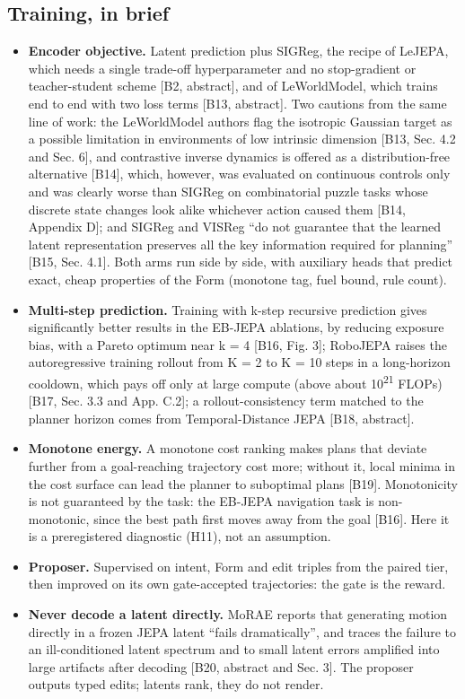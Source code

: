 \documentclass[10pt,letterpaper]{article}
\providecommand{\tightlist}{\setlength{\itemsep}{1pt}\setlength{\parskip}{0pt}}
\begin{document}
\subsection{Training, in brief}\label{training-in-brief}

\begin{itemize}
\tightlist
\item
  \textbf{Encoder objective.} Latent prediction plus SIGReg, the recipe
  of LeJEPA, which needs a single trade-off hyperparameter and no
  stop-gradient or teacher-student scheme {[}B2, abstract{]}, and of
  LeWorldModel, which trains end to end with two loss terms {[}B13,
  abstract{]}. Two cautions from the same line of work: the LeWorldModel
  authors flag the isotropic Gaussian target as a possible limitation in
  environments of low intrinsic dimension {[}B13, Sec. 4.2 and Sec.
  6{]}, and contrastive inverse dynamics is offered as a
  distribution-free alternative {[}B14{]}, which, however, was evaluated
  on continuous controls only and was clearly worse than SIGReg on
  combinatorial puzzle tasks whose discrete state changes look alike
  whichever action caused them {[}B14, Appendix D{]}; and SIGReg and
  VISReg ``do not guarantee that the learned latent representation
  preserves all the key information required for planning'' {[}B15, Sec.
  4.1{]}. Both arms run side by side, with auxiliary heads that predict
  exact, cheap properties of the Form (monotone tag, fuel bound, rule
  count).
\item
  \textbf{Multi-step prediction.} Training with k-step recursive
  prediction gives significantly better results in the EB-JEPA
  ablations, by reducing exposure bias, with a Pareto optimum near k = 4
  {[}B16, Fig. 3{]}; RoboJEPA raises the autoregressive training rollout
  from K = 2 to K = 10 steps in a long-horizon cooldown, which pays off
  only at large compute (above about 10\textsuperscript{21} FLOPs)
  {[}B17, Sec. 3.3 and App. C.2{]}; a rollout-consistency term matched
  to the planner horizon comes from Temporal-Distance JEPA {[}B18,
  abstract{]}.
\item
  \textbf{Monotone energy.} A monotone cost ranking makes plans that
  deviate further from a goal-reaching trajectory cost more; without it,
  local minima in the cost surface can lead the planner to suboptimal
  plans {[}B19{]}. Monotonicity is not guaranteed by the task: the
  EB-JEPA navigation task is non-monotonic, since the best path first
  moves away from the goal {[}B16{]}. Here it is a preregistered
  diagnostic (H11), not an assumption.
\item
  \textbf{Proposer.} Supervised on intent, Form and edit triples from
  the paired tier, then improved on its own gate-accepted trajectories:
  the gate is the reward.
\item
  \textbf{Never decode a latent directly.} MoRAE reports that generating
  motion directly in a frozen JEPA latent ``fails dramatically'', and
  traces the failure to an ill-conditioned latent spectrum and to small
  latent errors amplified into large artifacts after decoding {[}B20,
  abstract and Sec. 3{]}. The proposer outputs typed edits; latents
  rank, they do not render.
\end{itemize}
\end{document}
